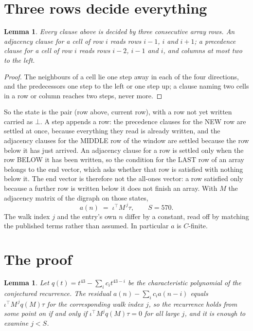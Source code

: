 \documentclass[11pt,a4paper]{article}
\theoremstyle{plain}
\newtheorem{lemma}[theorem]{Lemma}
\theoremstyle{definition}
\begin{document}
\section{Three rows decide everything}

\begin{lemma}\label{lem:win}
Every clause above is decided by three consecutive array rows. An adjacency clause for a cell
of row $i$ reads rows $i-1$, $i$ and $i+1$; a precedence clause for a cell of row $i$ reads
rows $i-2$, $i-1$ and $i$, and columns at most two to the left.
\end{lemma}

\begin{proof}
The neighbours of a cell lie one step away in each of the four directions, and the predecessors
one step to the left or one step up; a clause naming two cells in a row or column reaches two
steps, never more.
\end{proof}

So the state is the pair (row above, current row), with a row not yet written carried as
$\bot$. A step appends a row: the precedence clauses for the NEW row are settled at once,
because everything they read is already written, and the adjacency clauses for the MIDDLE row
of the window are settled because the row below it has just arrived. An adjacency clause for a row is settled only when the row BELOW it has been
written, so the condition for the LAST row of an array belongs to the end vector, which asks
whether that row is satisfied with nothing below it. The end vector is therefore not the
all-ones vector: a row satisfied only because a further row is written below it does not
finish an array. With $M$ the
adjacency matrix of the digraph on those states,
\[
a(n)\;=\;\iota^{\!\top}M^{\,j}\tau ,\qquad S=570.
\]
The walk index $j$ and the entry's own $n$ differ by a constant, read off by matching the
published terms rather than assumed. In particular $a$ is $C$-finite.

\section{The proof}

\begin{lemma}\label{lem:crit}
Let $q(t)=t^{43}-\sum_i c_it^{43-i}$ be the characteristic polynomial of the
conjectured recurrence. The residual $a(n)-\sum_ic_ia(n-i)$ equals
$\iota^{\!\top}M^{\,j}q(M)\tau$ for the corresponding walk index $j$, so the recurrence
holds from some point on if and only if $\iota^{\!\top}M^{j}q(M)\tau=0$ for all large $j$,
and it is enough to examine $j<S$.
\end{lemma}
\end{document}
